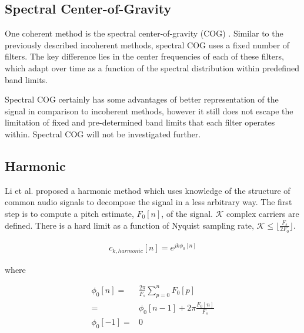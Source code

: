 \documentclass [11pt, proquest,oneside] {ganter_thesis}[2015/03/03]
\begin{document}


\subsection{Spectral Center-of-Gravity}

One coherent method is the spectral center-of-gravity (COG) \cite{clark2009time}.  Similar to the previously described incoherent methods, spectral COG uses a fixed number of filters.  The key difference lies in the center frequencies of each of these filters, which adapt over time as a function of the spectral distribution within predefined band limits.

Spectral COG certainly has some advantages of better representation of the signal in comparison to incoherent methods, however it still does not escape the limitation of fixed and pre-determined band limits that each filter operates within.  Spectral COG will not be investigated further.

\subsection{Harmonic}

Li et al. \cite{li2010harmonic} proposed a harmonic method which uses knowledge of the structure of common audio signals to decompose the signal in a less arbitrary way.  The first step is to compute a pitch estimate, $F_0[n]$, of the signal.  $\mathcal{K}$ complex carriers are defined.  There is a hard limit as a function of Nyquist sampling rate, $\mathcal{K} \leq  \Big\lfloor \frac{F_s}{2F_0} \Big\rfloor$.

\begin{align}
c_{k,harmonic}[n] = e^{jk\phi_0 [n]}
\end{align}

where

\begin{align}
\phi_0[n] =& \frac{2\pi}{F_s} \sum_{p=0}^{n} F_0[p] \nonumber \\
\label{eq:harmonic_phi0}
=& \phi_0[n - 1] + 2\pi \frac{F_0[n]}{F_s} \\
\phi_0[-1] =& 0 \nonumber
\end{align}
\end{document}
